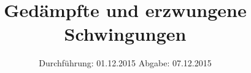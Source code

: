 

\subject{V354}
\title{Gedämpfte und erzwungene Schwingungen}
\date{
  Durchführung: 01.12.2015
  \hspace{3em}
  Abgabe: 07.12.2015
}



\maketitle
\thispagestyle{empty}
\tableofcontents
\newpage







\printbibliography


